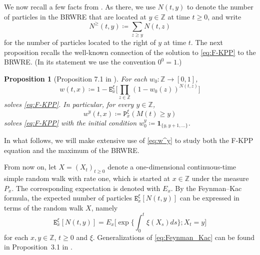 \documentclass[12pt,reqno,oneside]{amsart}
\numberwithin{equation}{section}
\newtheorem{proposition}[theorem]{Proposition}
\theoremstyle{definition}
\theoremstyle{remark}
\newcommand{\Z}{\mathbb{Z}}
\newcommand{\bbone}{\boldsymbol 1}
\begin{document}
We now recall a few facts from \cite{CD20}. As there, we use $N(t,y)$ to
denote the number of particles in the BRWRE that are located at $y \in \Z$ at
time $t \geq 0$, and write
\begin{equation*}
  N^\geq(t,y)\coloneq \sum_{z \geq y} N(t,z)
\end{equation*}
for the number of particles located to the right of $y$ at time $t$.
The next proposition recalls the well-known connection
of the solution to \eqref{eq:F-KPP} to the
BRWRE. (In its statement we use the convention $0^0 = 1$.)

\begin{proposition}[Proposition 7.1 in \cite{CD20}]
  For each $w_0: \Z \rightarrow[0,1]$,
  \begin{equation}\label{eq:McKean}
    w(t,x)\coloneq 1- \mathtt{E}_x^\xi\bigg[
      \prod_{z\in \Z}(1-w_0(z))^{N(t,z)}\bigg]
  \end{equation}
  solves \eqref{eq:F-KPP}. In particular, for every $y\in \mathbb Z$,
  \begin{equation}\label{eq:w^y}
    w^y(t,x) \coloneq \mathtt{P}_x^\xi(M(t)\geq y)
  \end{equation}
  solves \eqref{eq:F-KPP} with the initial condition
  $w_0^y\coloneq\bbone_{\{y,y+1,\dots \}}$.
\end{proposition}

In what follows, we will make extensive use of \eqref{eq:w^y} to study both
the F-KPP equation and the maximum of the BRWRE.

From now on, let $X=(X_t)_{t \geq 0}$ denote a one-dimensional
continuous-time simple random walk with rate one, which is started at
$x \in \Z$ under the measure $P_x$.
The corresponding expectation is denoted with $E_x$.
By the Feynman--Kac formula, the expected
number of particles $\mathtt{E}_x^\xi[N(t,y)]$ can be expressed in terms of
the random walk $X$, namely
\begin{equation}
  \label{eq:Feynman_Kac}
  \mathtt{E}^{\xi}_x[N(t,y)]
  =E_{x}\Big[ \exp\Big\{\int_0^t \xi(X_s) ds\Big\}; X_t= y\Big]
\end{equation}
for each $x,y \in \Z$, $t \geq 0 $ and $\xi$.  Generalizations of
\eqref{eq:Feynman_Kac} can be found in Proposition~3.1 in \cite{CD20}.
\end{document}
